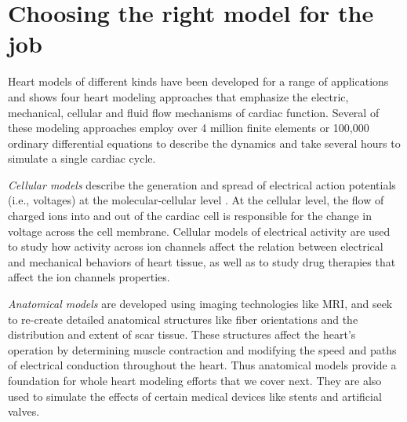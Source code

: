 \section{Choosing the right model for the job}
\label{sec:rightmodel}

Heart models of different kinds have been developed for a range of applications and 
 shows four heart modeling approaches that emphasize the electric, mechanical, cellular and fluid flow mechanisms of cardiac function. 
Several of these modeling approaches employ over 4 million finite elements or 100,000 ordinary differential equations to describe the dynamics and take several hours to simulate a single cardiac cycle. 

\emph{Cellular models} describe the generation and spread of electrical action potentials (i.e., voltages) at the molecular-cellular level \cite{PullanBC05_ElectricModelingBook}.
At the cellular level, the flow of charged ions into and out of the cardiac cell is responsible for the change in voltage across the cell membrane. 
Cellular models of electrical activity are used to study how activity across ion channels affect the relation between electrical and mechanical behaviors of heart tissue, as well as to study drug therapies that affect the ion channels properties. 

\emph{Anatomical models} are developed using imaging technologies like MRI, and seek to re-create detailed anatomical structures like fiber orientations and the distribution and extent of scar tissue. 
These structures affect the heart's operation by determining muscle contraction and modifying the speed and paths of electrical conduction throughout the heart. 
Thus anatomical models provide a foundation for whole heart modeling efforts that we cover next.
They are also used to simulate the effects of certain medical devices like stents and artificial valves. 

